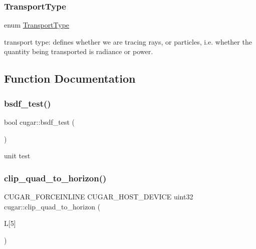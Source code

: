 \subsubsection{\texorpdfstring{Transport\+Type}{TransportType}}
{\footnotesize\ttfamily enum \hyperlink{group___b_s_d_f_module_gaca1e72535e7f260e54ed8bbf984dade9}{Transport\+Type}}

transport type\+: defines whether we are tracing rays, or particles, i.\+e. whether the quantity being transported is radiance or power. 

\subsection{Function Documentation}
\mbox{\label{group___b_s_d_f_module_ga6f553010172240343aa0890f04b7192c}} 
\subsubsection{\texorpdfstring{bsdf\+\_\+test()}{bsdf\_test()}}
{\footnotesize\ttfamily bool cugar\+::bsdf\+\_\+test (\begin{DoxyParamCaption}{ }\end{DoxyParamCaption})\hspace{0.3cm}{\ttfamily [inline]}}

unit test \mbox{\label{group___b_s_d_f_module_ga0ddbffc856042ea191e9ed868fe58ca9}} 
\subsubsection{\texorpdfstring{clip\+\_\+quad\+\_\+to\+\_\+horizon()}{clip\_quad\_to\_horizon()}}
{\footnotesize\ttfamily C\+U\+G\+A\+R\+\_\+\+F\+O\+R\+C\+E\+I\+N\+L\+I\+NE C\+U\+G\+A\+R\+\_\+\+H\+O\+S\+T\+\_\+\+D\+E\+V\+I\+CE uint32 cugar\+::clip\+\_\+quad\+\_\+to\+\_\+horizon (\begin{DoxyParamCaption}\item[{\hyperlink{structcugar_1_1_vector}{cugar\+::\+Vector3f}}]{L\mbox{[}5\mbox{]} }\end{DoxyParamCaption})}

